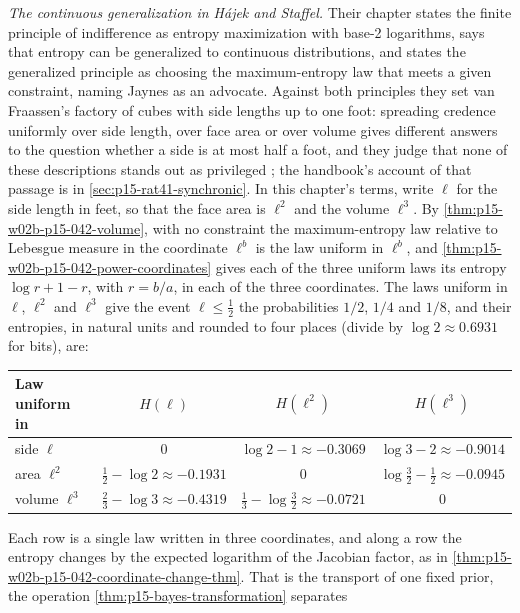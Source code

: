 \emph{The continuous generalization in H\'ajek and Staffel.} Their chapter
states the finite principle of indifference as entropy maximization with
base-2 logarithms, says that entropy can be generalized to continuous
distributions, and states the generalized principle as choosing the
maximum-entropy law that meets a given constraint, naming Jaynes as an
advocate. Against both principles they set van Fraassen's factory of cubes
with side lengths up to one foot: spreading credence uniformly over side
length, over face area or over volume gives different answers to the
question whether a side is at most half a foot, and they judge that none of
these descriptions stands out as privileged
\cite[p.~244]{HajekStaffel2021Dynamics}; the handbook's account of that
passage is in \cref{sec:p15-rat41-synchronic}. In this chapter's terms, write
\(\ell\) for the side length in feet, so that the face area is \(\ell^2\)
and the volume \(\ell^3\). By \cref{thm:p15-w02b-p15-042-volume}, with no
constraint the maximum-entropy law relative to Lebesgue measure in the
coordinate \(\ell^b\) is the law uniform in \(\ell^b\), and
\cref{thm:p15-w02b-p15-042-power-coordinates} gives each of the three
uniform laws its entropy \(\log r+1-r\), with \(r=b/a\), in each of the three
coordinates. The laws uniform in \(\ell\), \(\ell^2\) and \(\ell^3\) give
the event \(\ell\leq\tfrac12\) the probabilities \(1/2\), \(1/4\) and \(1/8\),
and their entropies, in natural units and rounded to four places (divide by
\(\log2\approx0.6931\) for bits), are:
\begin{center}
\small\setlength{\tabcolsep}{3pt}
\begin{tabular}{lccc}
\hline
Law uniform in & \(H(\ell)\) & \(H(\ell^2)\) & \(H(\ell^3)\)\\
\hline
side \(\ell\) & \(0\) & \(\log2-1\approx-0.3069\) & \(\log3-2\approx-0.9014\)\\
area \(\ell^2\) & \(\tfrac12-\log2\approx-0.1931\) & \(0\) & \(\log\tfrac32-\tfrac12\approx-0.0945\)\\
volume \(\ell^3\) & \(\tfrac23-\log3\approx-0.4319\) & \(\tfrac13-\log\tfrac32\approx-0.0721\) & \(0\)\\
\hline
\end{tabular}
\end{center}
Each row is a single law written in three coordinates, and along a row the
entropy changes by the expected logarithm of the Jacobian factor, as in
\cref{thm:p15-w02b-p15-042-coordinate-change-thm}. That is the transport of
one fixed prior, the operation \cref{thm:p15-bayes-transformation} separates
